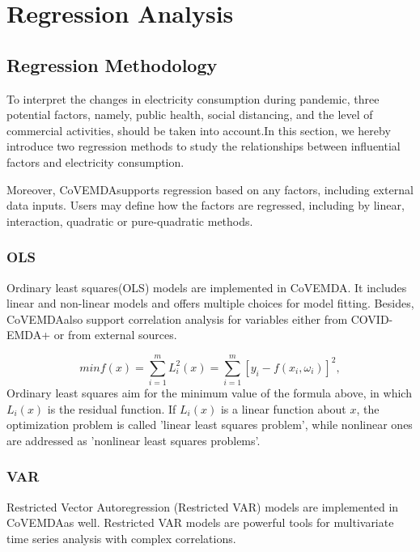 \documentclass[10pt]{article}
\newcommand{\covemda}{CoVEMDA}
\numberwithin{equation}{section}
\numberwithin{table}{section}
\numberwithin{figure}{section}
\begin{document}
\newpage
\section{Regression Analysis} \label{sec:regression}

\subsection{Regression Methodology}
 
To interpret the changes in electricity consumption during pandemic, three potential factors, namely, public health, social distancing, and the level of commercial activities, should be taken into account.In this section, we hereby introduce two regression methods to study the relationships between influential factors and electricity consumption.

Moreover, \covemda \quad supports regression based on any factors, including external data inputs. Users may define how the factors are regressed, including by linear, interaction, quadratic or pure-quadratic methods.

\subsubsection{OLS}

Ordinary least squares(OLS) models are implemented in \covemda. It includes linear and non-linear models and offers multiple choices for model fitting. Besides, \covemda \quad also support correlation analysis for variables either from COVID-EMDA+ or from external sources.

\begin{equation}
  min f(x)=\sum^{m}_{i=1}L_i^2(x)=\sum^{m}_{i=1}[y_i-f(x_i,\omega_i)]^2,
\end{equation}
Ordinary least squares aim for the minimum value of the formula above, in which $L_i(x)$ is the residual function. If $L_i(x)$ is a linear function about $x$, the optimization problem is called 'linear least squares problem', while nonlinear ones are addressed as 'nonlinear least squares problems'. 

\subsubsection{VAR}


Restricted Vector Autoregression (Restricted VAR) models are implemented in \covemda as well. Restricted VAR models are powerful tools for multivariate time series analysis with complex correlations.
\end{document}
